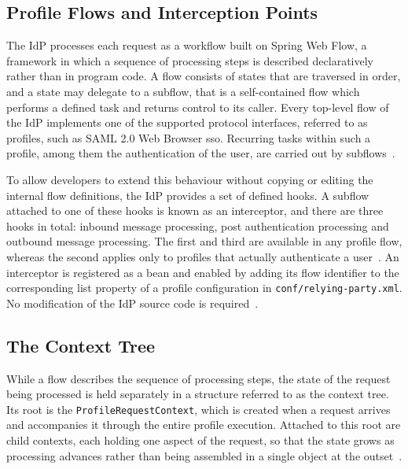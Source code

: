 \documentclass[../main.tex]{subfiles}
\begin{document}
\subsection{Profile Flows and Interception Points}\label{subsec:profile-flows}

The IdP processes each request as a workflow built on Spring Web Flow, a framework in which a 
sequence of processing steps is described declaratively rather than in program code. 
A flow consists of states that are traversed in order, and a state may delegate to a subflow, 
that is a self-contained flow which performs a defined task and returns control to its caller. 
Every top-level flow of the IdP implements one of the supported protocol interfaces, referred to 
as profiles, such as SAML 2.0 Web Browser \gls{sso}.
Recurring tasks within such a profile, among them the authentication of the user, are carried out 
by subflows~\cite{ProfileHandling}. 

To allow developers to extend this behaviour without copying or editing the internal flow definitions, 
the IdP provides a set of defined hooks. 
A subflow attached to one of these hooks is known as an interceptor, and there are three hooks in total: 
inbound message processing, post authentication processing and outbound message processing. 
The first and third are available in any profile flow, whereas the second applies only to profiles that 
actually authenticate a user~\cite{ProfileHandling}.
An interceptor is registered as a bean and enabled by adding its flow identifier to the corresponding list 
property of a profile configuration in \texttt{conf/relying-party.xml}. 
No modification of the IdP source code is required~\cite{ProfileInterceptConfiguration}.

\subsection{The Context Tree}\label{subsec:context-tree}

While a flow describes the sequence of processing steps, the state of the request being processed 
is held separately in a structure referred to as the context tree. 
Its root is the \texttt{Profile\allowbreak{}Request\allowbreak{}Context}, which is created when a 
request arrives and accompanies it through the entire profile execution. 
Attached to this root are child contexts, each holding one aspect of the request, so that the 
state grows as processing advances rather than being assembled in a single object at the 
outset~\cite{GeneralArchitecture, ProfileRequestContext}. 
\end{document}
